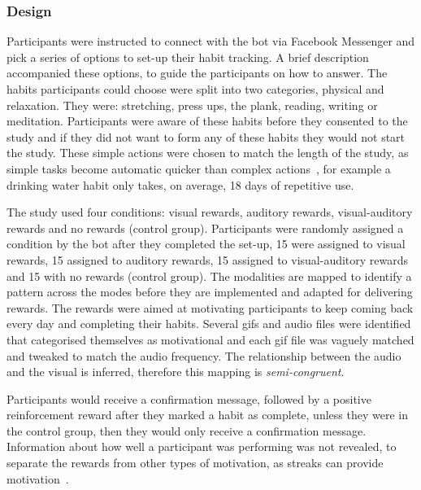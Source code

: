 \subsubsection{Design}
Participants were instructed to connect with the bot via Facebook Messenger and pick a series of options to set-up their habit tracking. A brief description accompanied these options, to guide the participants on how to answer. The habits participants could choose were split into two categories, physical and relaxation. They were: stretching, press ups, the plank, reading, writing or meditation. Participants were aware of these habits before they consented to the study and if they did not want to form any of these habits they would not start the study. These simple actions were chosen to match the length of the study, as simple tasks become automatic quicker than complex actions~\cite{article_how_habits_formed_modelling_habit_formation}, for example a drinking water habit only takes, on average, 18 days of repetitive use.

The study used four conditions: visual rewards, auditory rewards, visual-auditory rewards and no rewards (control group). Participants were randomly assigned a condition by the bot after they completed the set-up, 15 were assigned to visual rewards, 15 assigned to auditory rewards, 15 assigned to visual-auditory rewards and 15 with no rewards (control group). The modalities are mapped to identify a pattern across the modes before they are implemented and adapted for delivering rewards. The rewards were aimed at motivating participants to keep coming back every day and completing their habits. Several gifs and audio files were identified that categorised themselves as motivational and each gif file was vaguely matched and tweaked to match the audio frequency. The relationship between the audio and the visual is inferred, therefore this mapping is \textit{semi-congruent}.

Participants would receive a confirmation message, followed by a positive reinforcement reward after they marked a habit as complete, unless they were in the control group, then they would only receive a confirmation message. Information about how well a participant was performing was not revealed, to separate the rewards from other types of motivation, as streaks can provide motivation~\cite{article_dont_kick_habit}.

